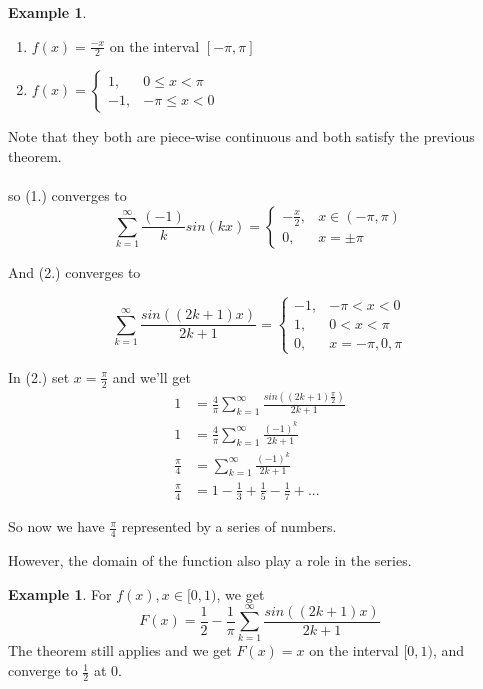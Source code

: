 \documentclass[12pt]{article}
\theoremstyle{plain}
\theoremstyle{definition}
\newtheorem{example}[theorem]{Example}
\begin{document}
\begin{example}
	\begin{enumerate}
		\item $f(x) = \frac{-x}{2}$ on the interval $[-\pi, \pi]$
		\item $f(x) = \begin{cases}
			1, &0\leq x < \pi\\
			-1, &-\pi\leq x < 0
		\end{cases}
$
	\end{enumerate}
	Note that they both are piece-wise continuous and both satisfy the previous theorem.\\
	\\
	so (1.) converges to
	$$\sum^\infty_{k=1} \frac{(-1)}{k} sin(kx) = \begin{cases}
		-\frac{x}{2}, &x\in (-\pi, \pi)\\
		0, &x = \pm \pi
	\end{cases}
$$

And (2.) converges to

$$\sum^\infty_{k=1} \frac{sin((2k+1)x)}{2k+1} = \begin{cases}
		-1, &-\pi < x < 0\\
		1, &0 < x < \pi\\
		0, &x = -\pi, 0,\pi
	\end{cases}
$$

In (2.) set $x = \frac{\pi}{2}$ and we'll get
\begin{align*}
	1 &= \frac{4}{\pi}\sum^\infty_{k=1} \frac{sin((2k+1)\frac{\pi}{2})}{2k+1}\\
	1 &=\frac{4}{\pi}\sum^\infty_{k=1} \frac{(-1)^k}{2k+1}\\
	\frac{\pi}{4}&= \sum^\infty_{k=1} \frac{(-1)^k}{2k+1}\\
	\frac{\pi}{4}&=1-\frac{1}{3}+\frac{1}{5}-\frac{1}{7}+...
\end{align*}

So now we have $\frac{\pi}{4}$ represented by a series of numbers.

\end{example}

However, the domain of the function also play a role in the series.

\begin{example}
	For $f(x), x\in[0,1)$, we get
	$$F(x) = \frac{1}{2} - \frac{1}{\pi}\sum^\infty_{k=1} \frac{sin((2k+1)x)}{2k+1}$$
	The theorem still applies and we get $F(x) = x$ on the interval $[0,1)$, and converge to $\frac{1}{2}$ at $0$. 
\end{example}
\end{document}
